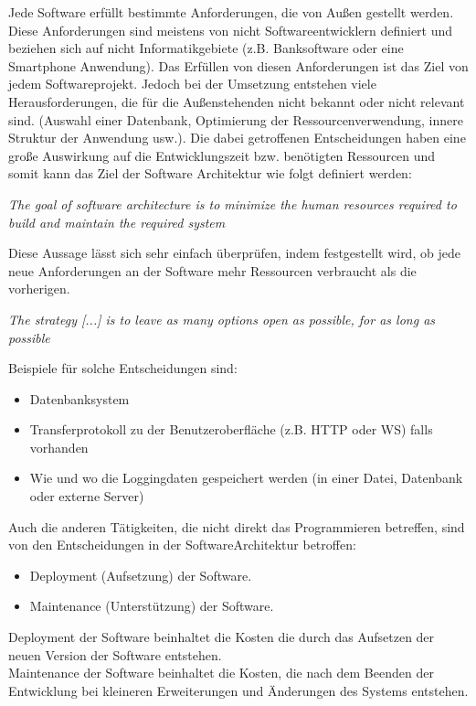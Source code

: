 Jede Software erfüllt bestimmte Anforderungen, die von Außen gestellt werden. 
Diese Anforderungen sind meistens von nicht Softwareentwicklern definiert und beziehen sich auf nicht Informatikgebiete 
    (z.B. Banksoftware oder eine Smartphone Anwendung). 
    Das Erfüllen von diesen Anforderungen ist das Ziel von jedem Softwareprojekt.
    Jedoch bei der Umsetzung entstehen viele Herausforderungen, die für die Außenstehenden nicht bekannt oder nicht relevant sind.
    (Auswahl einer Datenbank, Optimierung der Ressourcenverwendung, innere Struktur der Anwendung usw.). 
    Die dabei getroffenen Entscheidungen haben eine große Auswirkung auf die Entwicklungszeit bzw.
    benötigten Ressourcen und somit kann das Ziel der Software Architektur wie folgt definiert werden:

    \textit{The goal of software architecture is to minimize the human resources required
    to build and maintain the required system}\cite[5]{cleanArchitecture}

    Diese Aussage lässt sich sehr einfach überprüfen, indem festgestellt wird, 
    ob jede neue Anforderungen an der Software mehr Ressourcen verbraucht als die vorherigen.

    \textit{The strategy [...] is to leave as many options open as possible, for as long as possible}
    \cite[136]{cleanArchitecture}

    Beispiele für solche Entscheidungen sind:
    \begin{itemize}
        \item Datenbanksystem
        \item Transferprotokoll zu der Benutzeroberfläche (z.B. HTTP oder WS) falls vorhanden
        \item Wie und wo die Loggingdaten gespeichert werden (in einer Datei, Datenbank oder externe Server)
    \end{itemize}

    Auch die anderen Tätigkeiten, die nicht direkt das Programmieren betreffen, sind von den Entscheidungen in der SoftwareArchitektur betroffen:
    \begin{itemize}
        \item Deployment (Aufsetzung) der Software.
        \item Maintenance (Unterstützung) der Software.
    \end{itemize}

    Deployment der Software beinhaltet die Kosten die durch das Aufsetzen der neuen Version der Software entstehen.\\
    Maintenance der Software beinhaltet die Kosten, die nach dem Beenden der Entwicklung bei kleineren Erweiterungen und Änderungen des Systems entstehen.

